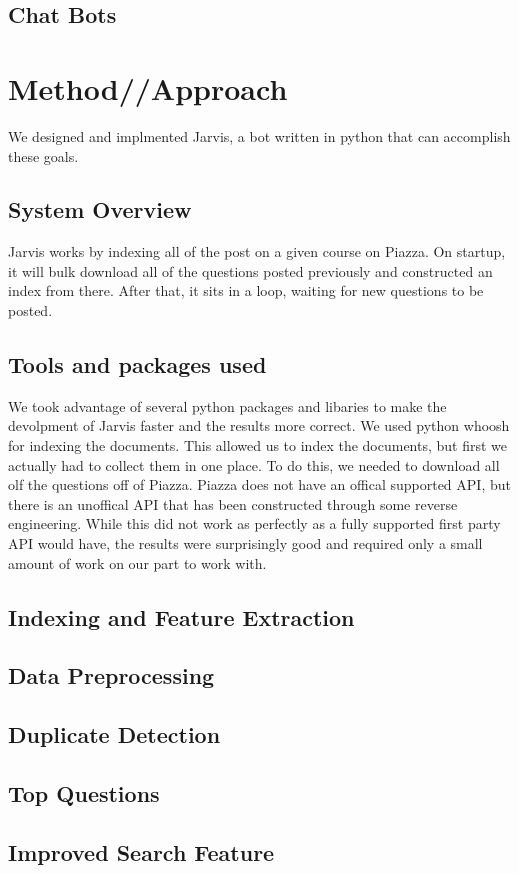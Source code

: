 \documentclass[sigconf]{acmart}
\begin{document}
\subsection{Chat Bots}

\section{Method//Approach}
We designed and implmented Jarvis, a bot written in python that can accomplish these goals. 

\subsection{System Overview}
Jarvis works by indexing all of the post on a given course on Piazza. On startup, it will bulk download all of the questions posted previously and constructed an index from there. After that, it sits in a loop, waiting for new questions to be posted. 

\subsection{Tools and packages used}
We took advantage of several python packages and libaries to make the devolpment of Jarvis faster and the results more correct. We used python whoosh for indexing the documents. This allowed us to index the documents, but first we actually had to collect them in one place. To do this, we needed to download all olf the questions off of Piazza. Piazza does not have an offical supported API, but there is an unoffical API that has been constructed through some reverse engineering. While this did not work as perfectly as a fully supported first party API would have, the results were surprisingly good and required only a small amount of work on our part to work with.

\subsection{Indexing and Feature Extraction}

\subsection{Data Preprocessing}

\subsection{Duplicate Detection}

\subsection{Top Questions}
\subsection{Improved Search Feature}



 
\end{document}
